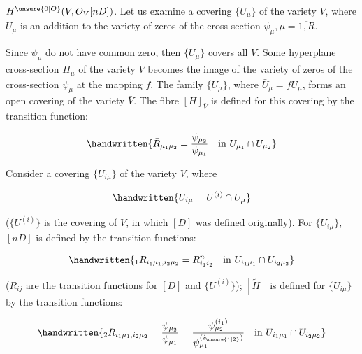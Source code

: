 
$H^{\unsure{0|O}}(V,O_V[nD])$. Let us examine a covering $\{U_\mu\}$ of the
variety $V$, where $U_\mu$ is an addition to the variety of
zeros of the cross-section $\psi_\mu, \mu=\overline{1,R}$.

Since $\psi_\mu$ do not have common zero, then $\{U_\mu\}$
covers all $V$. Some hyperplane cross-section $H_\mu$ of the
variety $\bar V$ becomes the image of the variety of zeros of
the cross-section $\psi_\mu$ at the mapping $f$. The family
$\{U_\mu\}$, where $\bar U_\mu=fU_\mu$, forms an open covering of the
variety $\bar V$. The fibre $[H]_{\bar V}$ is defined for this
covering by the transition function:

\[
\handwritten{\bar R_{\mu_1\mu_2}=\frac{\psi_{\mu_2}}{\psi_{\mu_1}}\quad\text{in } U_{\mu_1}\cap  U_{\mu_2}}
\]

Consider a covering $\{U_{i\mu}\}$ of the variety $V$, where

\[
\handwritten{U_{i\mu}=U^{(i)}\cap  U_\mu}
\]

($\{U^{(i)}\}$ is the covering of $V$, in which $[D]$ was defined
originally). For $\{U_{i\mu}\}$, $[nD]$ is defined by the transition
functions:

\[
\handwritten{{}_1R_{i_1\mu_1,i_2\mu_2}=R^n_{i_1i_2}\quad\text{in }U_{i_1\mu_1}\cap  U_{i_2\mu_2}}
\]

($R_{ij}$ are the transition functions for $[D]$ and $\{U^{(i)}\}$);
$[\tilde H]$ is defined for $\{U_{i\mu}\}$ by the transition functions:

\[
\handwritten{{}_2R_{i_1\mu_1,i_2\mu_2}=\frac{\psi_{\mu_2}}{\psi_{\mu_1}}=\frac{\psi_{\mu_2}^{(i_1)}}{\psi_{\mu_1}^{(i_{\unsure{1|2}})}}\quad\text{in }U_{i_1\mu_1}\cap  U_{i_2\mu_2}}
\]

